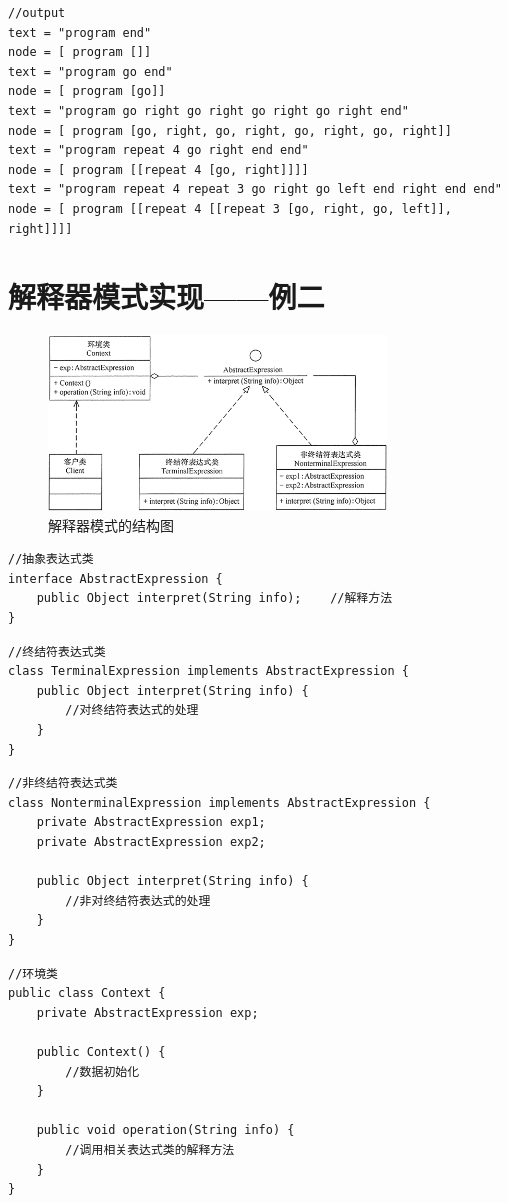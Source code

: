 \begin{lstlisting}
//output
text = "program end"
node = [ program []]
text = "program go end"
node = [ program [go]]
text = "program go right go right go right go right end"
node = [ program [go, right, go, right, go, right, go, right]]
text = "program repeat 4 go right end end"
node = [ program [[repeat 4 [go, right]]]]
text = "program repeat 4 repeat 3 go right go left end right end end"
node = [ program [[repeat 4 [[repeat 3 [go, right, go, left]], right]]]]
\end{lstlisting}
\section{解释器模式实现——例二}
\begin{figure}[!h]
	\centering
	\includegraphics[width=0.8\textwidth]{image/23-3}
	\caption{解释器模式的结构图}
\end{figure}
\begin{lstlisting}
//抽象表达式类
interface AbstractExpression {
	public Object interpret(String info);    //解释方法
}
\end{lstlisting}
\begin{lstlisting}
//终结符表达式类
class TerminalExpression implements AbstractExpression {
	public Object interpret(String info) {
		//对终结符表达式的处理
	}
}
\end{lstlisting}
\begin{lstlisting}
//非终结符表达式类
class NonterminalExpression implements AbstractExpression {
	private AbstractExpression exp1;
	private AbstractExpression exp2;
	
	public Object interpret(String info) {
		//非对终结符表达式的处理
	}
}
\end{lstlisting}
\begin{lstlisting}
//环境类
public class Context {
	private AbstractExpression exp;
	
	public Context() {
		//数据初始化
	}
	
	public void operation(String info) {
		//调用相关表达式类的解释方法
	}
}
\end{lstlisting}

